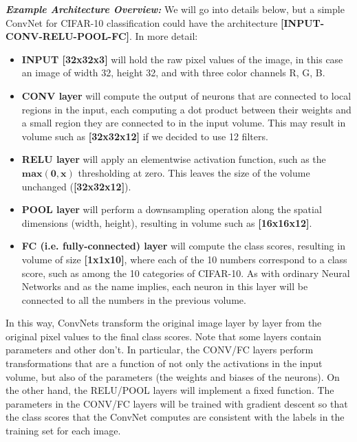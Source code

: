\documentclass[fleqn,10pt]{olplainarticle}
\theoremstyle{definition}
\theoremstyle{remark}
\begin{document}
\textbf{\textit{Example Architecture Overview:}} We will go into details below, but a simple ConvNet for CIFAR-10 classification could have the architecture \textbf{[INPUT-CONV-RELU-POOL-FC]}. In more detail:\medskip

\begin{itemize}
\item \textbf{INPUT [32x32x3]} will hold the raw pixel values of the image, in this case an image of width 32, height 32, and with three color channels R, G, B.
\item \textbf{CONV layer} will compute the output of neurons that are connected to local regions in the input, each computing a dot product between their weights and a small region they are connected to in the input volume. This may result in volume such as \textbf{[32x32x12]} if we decided to use 12 filters.
\item \textbf{RELU layer} will apply an elementwise activation function, such as the \(\mathbf{max(0,x)}\) thresholding at zero. This leaves the size of the volume unchanged (\textbf{[32x32x12]}).
\item \textbf{POOL layer} will perform a downsampling operation along the spatial dimensions (width, height), resulting in volume such as \textbf{[16x16x12]}.
\item \textbf{FC (i.e. fully-connected) layer} will compute the class scores, resulting in volume of size \textbf{[1x1x10]}, where each of the 10 numbers correspond to a class score, such as among the 10 categories of CIFAR-10. As with ordinary Neural Networks and as the name implies, each neuron in this layer will be connected to all the numbers in the previous volume.
\end{itemize}

In this way, ConvNets transform the original image layer by layer from the original pixel values to the final class scores. Note that some layers contain parameters and other don't. In particular, the CONV/FC layers perform transformations that are a function of not only the activations in the input volume, but also of the parameters (the weights and biases of the neurons). On the other hand, the RELU/POOL layers will implement a fixed function. The parameters in the CONV/FC layers will be trained with gradient descent so that the class scores that the ConvNet computes are consistent with the labels in the training set for each image.\medskip
\end{document}
